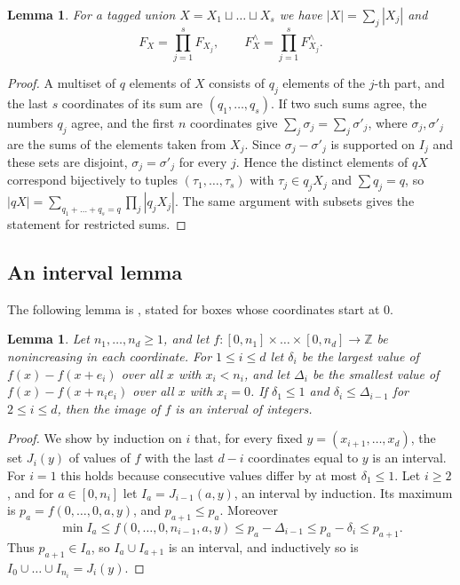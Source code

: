 \documentclass[11pt]{amsart}
\newtheorem{lemma}[theorem]{Lemma}
\theoremstyle{definition}
\theoremstyle{remark}
\numberwithin{equation}{section}
\newcommand{\Z}{\mathbb{Z}}
\newcommand{\Fr}{F^{\wedge}}
\begin{document}
\begin{lemma}\label{lem:product}
For a tagged union $X=X_1\sqcup\dots\sqcup X_s$ we have $|X|=\sum_j|X_j|$ and
\[
F_X=\prod_{j=1}^sF_{X_j},\qquad \Fr_X=\prod_{j=1}^s\Fr_{X_j}.
\]
\end{lemma}

\begin{proof}
A multiset of $q$ elements of $X$ consists of $q_j$ elements of the $j$-th part, and the last $s$ coordinates of its sum are $(q_1,\dots,q_s)$. If two such sums agree, the numbers $q_j$ agree, and the first $n$ coordinates give $\sum_j\sigma_j=\sum_j\sigma'_j$, where $\sigma_j,\sigma'_j$ are the sums of the elements taken from $X_j$. Since $\sigma_j-\sigma'_j$ is supported on $I_j$ and these sets are disjoint, $\sigma_j=\sigma'_j$ for every $j$. Hence the distinct elements of $qX$ correspond bijectively to tuples $(\tau_1,\dots,\tau_s)$ with $\tau_j\in q_jX_j$ and $\sum q_j=q$, so $|qX|=\sum_{q_1+\dots+q_s=q}\prod_j|q_jX_j|$. The same argument with subsets gives the statement for restricted sums.
\end{proof}

\subsection{An interval lemma}
The following lemma is \cite[Lemma~4.5]{Raj26}, stated for boxes whose coordinates start at $0$.

\begin{lemma}\label{lem:interval}
Let $n_1,\dots,n_d\ge 1$, and let $f\colon[0,n_1]\times\dots\times[0,n_d]\to\Z$ be nonincreasing in each coordinate. For $1\le i\le d$ let $\delta_i$ be the largest value of $f(x)-f(x+e_i)$ over all $x$ with $x_i<n_i$, and let $\Delta_i$ be the smallest value of $f(x)-f(x+n_ie_i)$ over all $x$ with $x_i=0$. If $\delta_1\le 1$ and $\delta_i\le\Delta_{i-1}$ for $2\le i\le d$, then the image of $f$ is an interval of integers.
\end{lemma}

\begin{proof}
We show by induction on $i$ that, for every fixed $y=(x_{i+1},\dots,x_d)$, the set $J_i(y)$ of values of $f$ with the last $d-i$ coordinates equal to $y$ is an interval. For $i=1$ this holds because consecutive values differ by at most $\delta_1\le 1$. Let $i\ge 2$, and for $a\in[0,n_i]$ let $I_a=J_{i-1}(a,y)$, an interval by induction. Its maximum is $p_a=f(0,\dots,0,a,y)$, and $p_{a+1}\le p_a$. Moreover
\[
\min I_a\le f(0,\dots,0,n_{i-1},a,y)\le p_a-\Delta_{i-1}\le p_a-\delta_i\le p_{a+1}.
\]
Thus $p_{a+1}\in I_a$, so $I_a\cup I_{a+1}$ is an interval, and inductively so is $I_0\cup\dots\cup I_{n_i}=J_i(y)$.
\end{proof}
\end{document}
